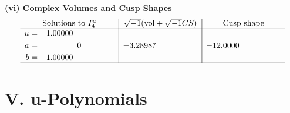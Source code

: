 \documentclass[1p]{elsarticle_modified}
\theoremstyle{definition}
\newcommand{\I}{\sqrt{-1}}
\begin{document}
\newpage\flushleft \textbf{(vi) Complex Volumes and Cusp Shapes}
$$\begin{array}{c|c|c}  
\text{Solutions to }I^u_{4}& \I (\text{vol} + \sqrt{-1}CS) & \text{Cusp shape}\\
 \hline 
\begin{aligned}
u &= \phantom{-}1.00000\phantom{ +0.000000I} \\
a &= \phantom{-0.000000 } 0 \\
b &= -1.00000\phantom{ +0.000000I}\end{aligned}
 & -3.28987\phantom{ +0.000000I} & -12.0000\phantom{ +0.000000I}\\
 \hline 
 \end{array}$$\newpage
\newpage\renewcommand{\arraystretch}{1}
\centering \section*{ V. u-Polynomials}
\end{document}
